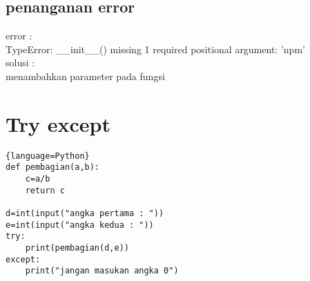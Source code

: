 \subsection{penanganan error}
error :\\
TypeError: \_\_init\_\_() missing 1 required positional argument: 'npm'\\
solusi :\\
menambahkan parameter pada fungsi
\section*{Try except}
\begin{lstlisting}{language=Python}
def pembagian(a,b):
    c=a/b
    return c

d=int(input("angka pertama : "))
e=int(input("angka kedua : "))
try:
    print(pembagian(d,e))
except:
    print("jangan masukan angka 0")
\end{lstlisting}